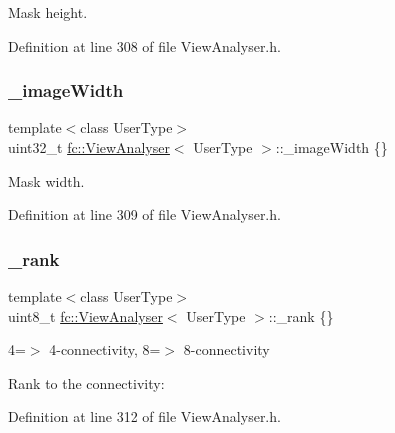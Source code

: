 Mask height. 



Definition at line 308 of file View\+Analyser.\+h.

\mbox{\label{classfc_1_1ViewAnalyser_abb6375bb2d391f0175ff0e433bf6904d}} 
\subsubsection{\texorpdfstring{\+\_\+image\+Width}{\_imageWidth}}
{\footnotesize\ttfamily template$<$class User\+Type$>$ \\
uint32\+\_\+t \hyperlink{classfc_1_1ViewAnalyser}{fc\+::\+View\+Analyser}$<$ User\+Type $>$\+::\+\_\+image\+Width \{\}\hspace{0.3cm}{\ttfamily [private]}}



Mask width. 



Definition at line 309 of file View\+Analyser.\+h.

\mbox{\label{classfc_1_1ViewAnalyser_a6c4eb5399fbe8920e3f2ca4dc794dbc6}} 
\subsubsection{\texorpdfstring{\+\_\+rank}{\_rank}}
{\footnotesize\ttfamily template$<$class User\+Type$>$ \\
uint8\+\_\+t \hyperlink{classfc_1_1ViewAnalyser}{fc\+::\+View\+Analyser}$<$ User\+Type $>$\+::\+\_\+rank \{\}\hspace{0.3cm}{\ttfamily [private]}}



4=$>$ 4-\/connectivity, 8=$>$ 8-\/connectivity 

Rank to the connectivity\+: 

Definition at line 312 of file View\+Analyser.\+h.

\mbox{\label{classfc_1_1ViewAnalyser_aaebba5c87fe2f3d6939ccd1c84a68510}} 
